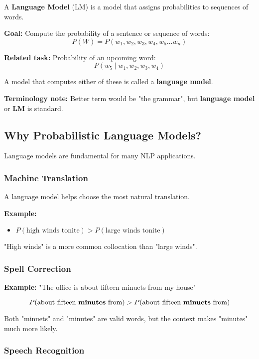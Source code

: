 \documentclass[11pt,a4paper]{article}
\theoremstyle{definition}
\theoremstyle{plain}
\theoremstyle{remark}
\begin{document}
A \textbf{Language Model} (LM) is a model that assigns probabilities to sequences of words.

\textbf{Goal:} Compute the probability of a sentence or sequence of words:
\[
P(W) = P(w_1, w_2, w_3, w_4, w_5 \ldots w_n)
\]

\textbf{Related task:} Probability of an upcoming word:
\[
P(w_5 \mid w_1, w_2, w_3, w_4)
\]

A model that computes either of these is called a \textbf{language model}.

\textbf{Terminology note:} Better term would be "the grammar", but \textbf{language model} or \textbf{LM} is standard.

\subsection{Why Probabilistic Language Models?}

Language models are fundamental for many NLP applications.

\subsubsection{Machine Translation}

A language model helps choose the most natural translation.

\textbf{Example:}
\begin{itemize}
    \item $P(\text{high winds tonite}) > P(\text{large winds tonite})$
\end{itemize}

"High winds" is a more common collocation than "large winds".

\subsubsection{Spell Correction}

\textbf{Example:} "The office is about fifteen minuets from my house"

\[
P(\text{about fifteen \textbf{minutes} from}) > P(\text{about fifteen \textbf{minuets} from})
\]

Both "minuets" and "minutes" are valid words, but the context makes "minutes" much more likely.

\subsubsection{Speech Recognition}
\end{document}
